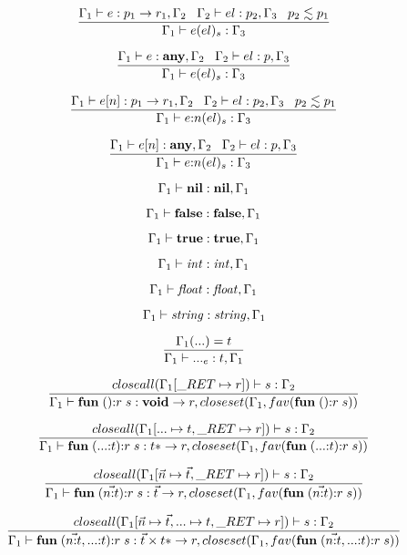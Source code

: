 \[
\dfrac{\Gamma_{1} \vdash e:p_{1} \rightarrow r_{1}, \Gamma_{2} \;\;\;
       \Gamma_{2} \vdash el:p_{2}, \Gamma_{3} \;\;\;
       p_{2} \lesssim p_{1}}
      {\Gamma_{1} \vdash e(el)_{s}:\Gamma_{3}}
\]

\[
\dfrac{\Gamma_{1} \vdash e:\mathbf{any}, \Gamma_{2} \;\;\;
       \Gamma_{2} \vdash el:p, \Gamma_{3}}
      {\Gamma_{1} \vdash e(el)_{s}:\Gamma_{3}}
\]

\[
\dfrac{\Gamma_{1} \vdash e[n]:p_{1} \rightarrow r_{1}, \Gamma_{2} \;\;\;
       \Gamma_{2} \vdash el:p_{2}, \Gamma_{3} \;\;\;
       p_{2} \lesssim p_{1}}
      {\Gamma_{1} \vdash e{:}n(el)_{s}:\Gamma_{3}}
\]

\[
\dfrac{\Gamma_{1} \vdash e[n]:\mathbf{any}, \Gamma_{2} \;\;\;
       \Gamma_{2} \vdash el:p, \Gamma_{3}}
      {\Gamma_{1} \vdash e{:}n(el)_{s}:\Gamma_{3}}
\]

\[
\Gamma_{1} \vdash \mathbf{nil}:\mathbf{nil}, \Gamma_{1}
\]

\[
\Gamma_{1} \vdash \mathbf{false}:\mathbf{false}, \Gamma_{1}
\]

\[
\Gamma_{1} \vdash \mathbf{true}:\mathbf{true}, \Gamma_{1}
\]

\[
\Gamma_{1} \vdash {\it int}:{\it int}, \Gamma_{1}
\]

\[
\Gamma_{1} \vdash {\it float}:{\it float}, \Gamma_{1}
\]

\[
\Gamma_{1} \vdash {\it string}:{\it string}, \Gamma_{1}
\]

\[
\dfrac{\Gamma_{1}({...}) = t}
      {\Gamma_{1} \vdash {...}_{e}:t, \Gamma_{1}}
\]

\[
\dfrac{closeall(\env_{1}[\ret \mapsto r]) \vdash s:\env_{2}}
      {\env_{1} \vdash \mathbf{fun} \; (){:}r \; s:\Void \rightarrow r, closeset(\env_{1}, fav(\mathbf{fun} \; (){:}r \; s))}
\]

\[
\dfrac{closeall(\env_{1}[{...} \mapsto t, \ret \mapsto r]) \vdash s:\env_{2}}
      {\env_{1} \vdash \mathbf{fun} \; ({...}{:}t){:}r \; s:t{*} \rightarrow r, closeset(\env_{1}, fav(\mathbf{fun} \; ({...}{:}t){:}r \; s))}
\]

\[
\dfrac{closeall(\env_{1}[\vec{n} \mapsto \vec{t}, \ret \mapsto r]) \vdash s:\env_{2}}
      {\env_{1} \vdash \mathbf{fun} \; (\vec{n{:}t}){:}r \; s:\vec{t} \rightarrow r, closeset(\env_{1}, fav(\mathbf{fun} \; (\vec{n{:}t}){:}r \; s))}
\]

\[
\dfrac{closeall(\env_{1}[\vec{n} \mapsto \vec{t}, {...} \mapsto t, \ret \mapsto r]) \vdash s:\env_{2}}
      {\env_{1} \vdash \mathbf{fun} \; (\vec{n{:}t},{...}{:}t){:}r \; s: \vec{t} \times t{*} \rightarrow r, closeset(\env_{1}, fav(\mathbf{fun} \; (\vec{n{:}t},{...}{:}t){:}r \; s))}
\]

